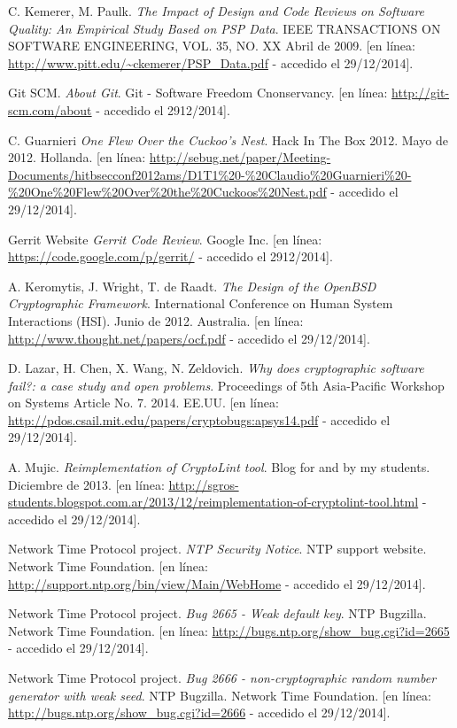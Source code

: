 \documentclass{beamer}
\begin{document}
\begin{thebibliography}{99}
	C. Kemerer, M. Paulk.
	\emph{The Impact of Design and Code Reviews on Software Quality: An Empirical Study Based on PSP Data}.
	IEEE TRANSACTIONS ON SOFTWARE ENGINEERING, VOL. 35, NO. XX
	Abril de 2009. 
	[en línea: \url{http://www.pitt.edu/~ckemerer/PSP_Data.pdf} - accedido el 29/12/2014].
	
	Git SCM.
	\emph{About Git}.
	Git - Software Freedom Cnonservancy.
	[en línea: \url{http://git-scm.com/about} - accedido el 2912/2014].
	
	C. Guarnieri
	\emph{One Flew Over the Cuckoo’s Nest}.
	Hack In The Box 2012.
	Mayo de 2012. Hollanda.
	[en línea: \url{http://sebug.net/paper/Meeting-Documents/hitbsecconf2012ams/D1T1%20-%20Claudio%20Guarnieri%20-%20One%20Flew%20Over%20the%20Cuckoos%20Nest.pdf} - accedido el 29/12/2014].
		
	Gerrit Website
	\emph{Gerrit Code Review}.
	Google Inc.
	[en línea: \url{https://code.google.com/p/gerrit/} - accedido el 2912/2014].
	
	A. Keromytis, J. Wright, T. de Raadt.
	\emph{The Design of the OpenBSD Cryptographic Framework}.
	International Conference on Human System Interactions (HSI).
	Junio de 2012. Australia.
	[en línea: \url{http://www.thought.net/papers/ocf.pdf} - accedido el 29/12/2014].
	
	D. Lazar, H. Chen, X. Wang, N. Zeldovich.
	\emph{Why does cryptographic software fail?: a case study and open problems}.
	Proceedings of 5th Asia-Pacific Workshop on Systems Article No. 7.
	2014. EE.UU.
	[en línea: \url{http://pdos.csail.mit.edu/papers/cryptobugs:apsys14.pdf} - accedido el 29/12/2014].
	
	A. Mujic.
	\emph{Reimplementation of CryptoLint tool}.
	Blog for and by my students.
	Diciembre de 2013.
	[en línea: \url{http://sgros-students.blogspot.com.ar/2013/12/reimplementation-of-cryptolint-tool.html} - accedido el 29/12/2014].
	
	Network Time Protocol project.
	\emph{NTP Security Notice}.
	NTP support website. Network Time Foundation.
	[en línea: \url{http://support.ntp.org/bin/view/Main/WebHome} - accedido el 29/12/2014].
	
	Network Time Protocol project.
	\emph{Bug 2665 - Weak default key}.
	NTP Bugzilla. Network Time Foundation.
	[en línea: \url{http://bugs.ntp.org/show_bug.cgi?id=2665} - accedido el 29/12/2014].
	
	Network Time Protocol project.
	\emph{Bug 2666 - non-cryptographic random number generator with weak seed}.
	NTP Bugzilla. Network Time Foundation.
	[en línea: \url{http://bugs.ntp.org/show_bug.cgi?id=2666} - accedido el 29/12/2014].
	

\end{thebibliography}
\end{document}
